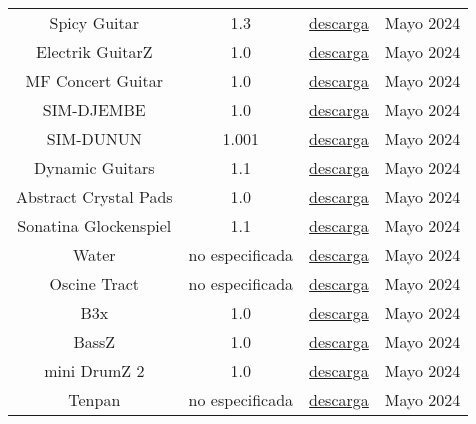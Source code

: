 \begin{table}[h]
\begin{tabular}{c|c|c|c}
            Spicy Guitar & 1.3 & \href{https://plugins4free.com/plugin/1065/}{descarga} & Mayo 2024\\
            
            Electrik GuitarZ & 1.0 & \href{https://plugins4free.com/plugin/406/}{descarga} & Mayo 2024\\
            
            MF Concert Guitar & 1.0 & \href{https://plugins4free.com/plugin/2317/}{descarga} & Mayo 2024\\

            
            SIM-DJEMBE & 1.0 & \href{https://plugins4free.com/plugin/3709/}{descarga} & Mayo 2024\\
            
            SIM-DUNUN & 1.001 & \href{https://plugins4free.com/plugin/3721/}{descarga} & Mayo 2024\\

            Dynamic Guitars & 1.1 & \href{https://plugins4free.com/plugin/2158/}{descarga} & Mayo 2024\\

            Abstract Crystal Pads & 1.0 & \href{https://www.samplescience.info/2022/01/abstract-crystal-pads.html}{descarga} & Mayo 2024\\
            
            Sonatina Glockenspiel & 1.1 & \href{https://plugins4free.com/plugin/2329/}{descarga} & Mayo 2024\\
            
            Water & no especificada & \href{https://www.kvraudio.com/product/water-by-xoxos}{descarga} & Mayo 2024\\
            
            Oscine Tract & no especificada & \href{https://plugins4free.com/plugin/1251/}{descarga} & Mayo 2024\\
            
            B3x & 1.0 & \href{https://plugins4free.com/plugin/278/}{descarga} & Mayo 2024\\

            
            BassZ & 1.0 & \href{https://plugins4free.com/plugin/334/}{descarga} & Mayo 2024\\
            
            mini DrumZ 2 & 1.0 & \href{https://plugins4free.com/plugin/423/}{descarga} & Mayo 2024\\
            
            Tenpan & no especificada & \href{https://freevstplugins.net/tenpan/}{descarga} & Mayo 2024\\
            

\end{tabular}
\end{table}
